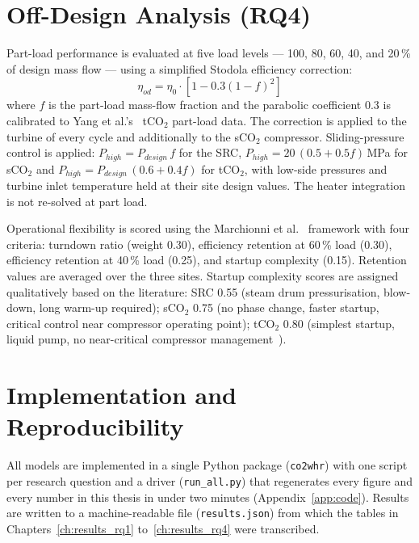 \section{Off-Design Analysis (RQ4)}
\label{sec:method_rq4}

Part-load performance is evaluated at five load levels --- 100, 80, 60, 40,
and 20\,\% of design mass flow --- using a simplified Stodola efficiency
correction:
\begin{equation}
\eta_{od} = \eta_0 \cdot [1 - 0.3(1-f)^2]
\label{eq:stodola}
\end{equation}
where $f$ is the part-load mass-flow fraction and the parabolic coefficient
$0.3$ is calibrated to Yang et al.'s~\cite{Yang2024} tCO$_2$ part-load data.
The correction is applied to the turbine of every cycle and additionally to
the sCO$_2$ compressor. Sliding-pressure control is applied: $P_{high} =
P_{design}\,f$ for the SRC, $P_{high} = 20\,(0.5 + 0.5f)$\,MPa for sCO$_2$
and $P_{high} = P_{design}\,(0.6 + 0.4f)$ for tCO$_2$, with low-side
pressures and turbine inlet temperature held at their site design values.
The heater integration is not re-solved at part load.

Operational flexibility is scored using the Marchionni et
al.~\cite{Marchionni2020} framework with four criteria: turndown ratio (weight
0.30), efficiency retention at 60\,\% load (0.30), efficiency retention at
40\,\% load (0.25), and startup complexity (0.15). Retention values are
averaged over the three sites. Startup complexity scores are assigned
qualitatively based on the literature: SRC 0.55 (steam drum pressurisation,
blow-down, long warm-up required); sCO$_2$ 0.75 (no phase change, faster
startup, critical control near compressor operating point); tCO$_2$ 0.80
(simplest startup, liquid pump, no near-critical compressor
management~\cite{Marchionni2020}).

\section{Implementation and Reproducibility}
\label{sec:method_code}

All models are implemented in a single Python package (\texttt{co2whr}) with
one script per research question and a driver (\texttt{run\_all.py}) that
regenerates every figure and every number in this thesis in under two minutes
(Appendix~\ref{app:code}). Results are written to a machine-readable file
(\texttt{results.json}) from which the tables in Chapters~\ref{ch:results_rq1}
to~\ref{ch:results_rq4} were transcribed.
